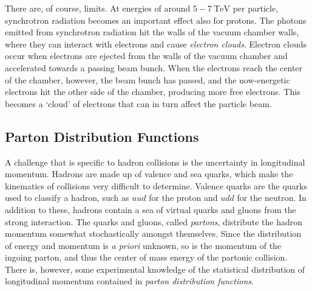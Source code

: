 \documentclass[twoside,english]{uiofysmaster}
\begin{document}
{There are, of course, limits. At energies of around $5-7~\mathrm{TeV}$ per particle, synchrotron radiation becomes an important effect also for protons. The photons emitted from synchrotron radiation hit the walls of the vacuum chamber walls, where they can interact with electrons and cause \textit{electron clouds}. Electron clouds occur when electrons are ejected from the walls of the vacuum chamber and accelerated towards a passing beam bunch. When the electrons reach the center of the chamber, however, the beam bunch has passed, and the now-energetic electrons hit the other side of the chamber, producing more free electrons. This becomes a `cloud' of electrons that can in turn affect the particle beam. 


\subsection{Parton Distribution Functions}\label{Sec:: susy hadron : Parton Distribution Functions}

A challenge that is specific to hadron collisions is the uncertainty in longitudinal momentum. Hadrons are made up of valence and sea quarks, which make the kinematics of collisions very difficult to determine. Valence quarks are the quarks used to classify a hadron, such as $uud$ for the proton and $udd$ for the neutron. In addition to these, hadrons contain a sea of virtual quarks and gluons from the strong interaction. The quarks and gluons, called \textit{partons}, distribute the hadron momentum somewhat stochastically amongst themselves. Since the distribution of energy and momentum is \textit{a priori} unknown, so is the momentum of the ingoing parton, and thus the center of mass energy of the partonic collision. There is, however, some experimental knowledge of the statistical distribution of longitudinal momentum contained in \textit{parton distribution functions}.

}
\end{document}
